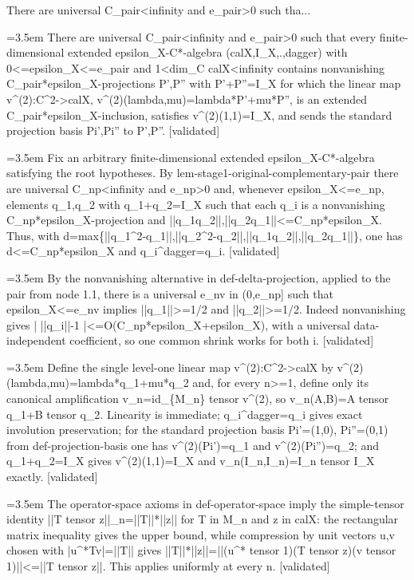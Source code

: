 \documentclass{article}
\newcommand{\step}[1]{\par\noindent\hangindent=3.5em\hangafter=1%
  \makebox[3.5em][l]{\textbf{#1.}}}
\newcommand{\steptag}[1]{\hfill{\small\textsf{[#1]}}}
\begin{document}
\begin{proofbox}{There are universal C\_pair<infinity and e\_pair>0 such tha...}
\step{1} There are universal C\_pair<infinity and e\_pair>0 such that every finite-dimensional extended epsilon\_X-C*-algebra (calX,I\_X,.,dagger) with 0<=epsilon\_X<=e\_pair and 1<dim\_C calX<infinity contains nonvanishing C\_pair*epsilon\_X-projections P',P'' with P'+P''=I\_X for which the linear map v\textasciicircum{}(2):C\textasciicircum{}2->calX, v\textasciicircum{}(2)(lambda,mu)=lambda*P'+mu*P'', is an extended C\_pair*epsilon\_X-inclusion, satisfies v\textasciicircum{}(2)(1,1)=I\_X, and sends the standard projection basis Pi',Pi'' to P',P''. \steptag{validated} \\[6pt]
\step{1.1} Fix an arbitrary finite-dimensional extended epsilon\_X-C*-algebra satisfying the root hypotheses. By lem-stage1-original-complementary-pair there are universal C\_np<infinity and e\_np>0 and, whenever epsilon\_X<=e\_np, elements q\_1,q\_2 with q\_1+q\_2=I\_X such that each q\_i is a nonvanishing C\_np*epsilon\_X-projection and ||q\_1q\_2||,||q\_2q\_1||<=C\_np*epsilon\_X. Thus, with d=max\{||q\_1\textasciicircum{}2-q\_1||,||q\_2\textasciicircum{}2-q\_2||,||q\_1q\_2||,||q\_2q\_1||\}, one has d<=C\_np*epsilon\_X and q\_i\textasciicircum{}dagger=q\_i. \steptag{validated} \\[4pt]
\step{1.2} By the nonvanishing alternative in def-delta-projection, applied to the pair from node 1.1, there is a universal e\_nv in (0,e\_np] such that epsilon\_X<=e\_nv implies ||q\_1||>=1/2 and ||q\_2||>=1/2. Indeed nonvanishing gives | ||q\_i||-1 |<=O(C\_np*epsilon\_X+epsilon\_X), with a universal data-independent coefficient, so one common shrink works for both i. \steptag{validated} \\[4pt]
\step{1.3} Define the single level-one linear map v\textasciicircum{}(2):C\textasciicircum{}2->calX by v\textasciicircum{}(2)(lambda,mu)=lambda*q\_1+mu*q\_2 and, for every n>=1, define only its canonical amplification v\_n=id\_\{M\_n\} tensor v\textasciicircum{}(2), so v\_n(A,B)=A tensor q\_1+B tensor q\_2. Linearity is immediate; q\_i\textasciicircum{}dagger=q\_i gives exact involution preservation; for the standard projection basis Pi'=(1,0), Pi''=(0,1) from def-projection-basis one has v\textasciicircum{}(2)(Pi')=q\_1 and v\textasciicircum{}(2)(Pi'')=q\_2; and q\_1+q\_2=I\_X gives v\textasciicircum{}(2)(1,1)=I\_X and v\_n(I\_n,I\_n)=I\_n tensor I\_X exactly. \steptag{validated} \\[4pt]
\step{1.4} The operator-space axioms in def-operator-space imply the simple-tensor identity ||T tensor z||\_n=||T||*||z|| for T in M\_n and z in calX: the rectangular matrix inequality gives the upper bound, while compression by unit vectors u,v chosen with |u\textasciicircum{}*Tv|=||T|| gives ||T||*||z||=||(u\textasciicircum{}* tensor 1)(T tensor z)(v tensor 1)||<=||T tensor z||. This applies uniformly at every n. \steptag{validated} \\[4pt]

\end{proofbox}
\end{document}
